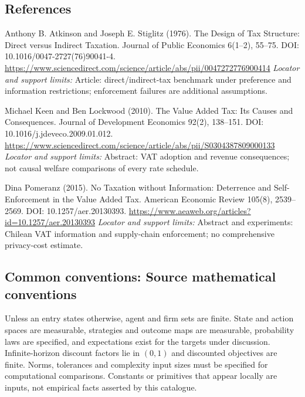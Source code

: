 \documentclass[11pt,a4paper]{article}
\begin{document}
\subsection*{References}
\begin{enumerate}[label={[S\arabic*]},leftmargin=*,itemsep=0.6em]
\item Anthony B. Atkinson and Joseph E. Stiglitz (1976). The Design of Tax Structure: Direct versus Indirect Taxation. Journal of Public Economics 6(1--2), 55--75. DOI: 10.1016/0047-2727(76)90041-4.
\url{https://www.sciencedirect.com/science/article/abs/pii/0047272776900414}
\newline\emph{Locator and support limits:} Article: direct/indirect-tax benchmark under preference and information restrictions; enforcement failures are additional assumptions.
\item Michael Keen and Ben Lockwood (2010). The Value Added Tax: Its Causes and Consequences. Journal of Development Economics 92(2), 138--151. DOI: 10.1016/j.jdeveco.2009.01.012.
\url{https://www.sciencedirect.com/science/article/abs/pii/S0304387809000133}
\newline\emph{Locator and support limits:} Abstract: VAT adoption and revenue consequences; not causal welfare comparisons of every rate schedule.
\item Dina Pomeranz (2015). No Taxation without Information: Deterrence and Self-Enforcement in the Value Added Tax. American Economic Review 105(8), 2539--2569. DOI: 10.1257/aer.20130393.
\url{https://www.aeaweb.org/articles?id=10.1257/aer.20130393}
\newline\emph{Locator and support limits:} Abstract and experiments: Chilean VAT information and supply-chain enforcement; no comprehensive privacy-cost estimate.
\end{enumerate}

\subsection*{Common conventions: Source mathematical conventions}

Unless an entry states otherwise, agent and firm sets are finite. State and action spaces are measurable, strategies and outcome maps are measurable, probability laws are specified, and expectations exist for the targets under discussion. Infinite-horizon discount factors lie in $(0,1)$ and discounted objectives are finite. Norms, tolerances and complexity input sizes must be specified for computational comparisons. Constants or primitives that appear locally are inputs, not empirical facts asserted by this catalogue.
\end{document}
